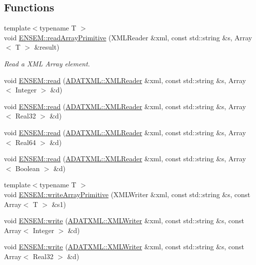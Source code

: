 \subsection*{Functions}
\begin{DoxyCompactItemize}
\item 
{\footnotesize template$<$typename T $>$ }\\void \mbox{\hyperlink{namespaceENSEM_a595aa36e757c1e7259eeaf7e6421941c}{E\+N\+S\+E\+M\+::read\+Array\+Primitive}} (X\+M\+L\+Reader \&xml, const std\+::string \&s, Array$<$ T $>$ \&result)
\begin{DoxyCompactList}\small\item\em Read a X\+ML Array element. \end{DoxyCompactList}\item 
void \mbox{\hyperlink{namespaceENSEM_a59df78af1e673ccefd2496b40ffcebac}{E\+N\+S\+E\+M\+::read}} (\mbox{\hyperlink{classADATXML_1_1XMLReader}{A\+D\+A\+T\+X\+M\+L\+::\+X\+M\+L\+Reader}} \&xml, const std\+::string \&s, Array$<$ Integer $>$ \&d)
\item 
void \mbox{\hyperlink{namespaceENSEM_a35ede464f1c4210bc6236f281a40ee73}{E\+N\+S\+E\+M\+::read}} (\mbox{\hyperlink{classADATXML_1_1XMLReader}{A\+D\+A\+T\+X\+M\+L\+::\+X\+M\+L\+Reader}} \&xml, const std\+::string \&s, Array$<$ Real32 $>$ \&d)
\item 
void \mbox{\hyperlink{namespaceENSEM_ae92990139593325dd95e78b0bc6aa89d}{E\+N\+S\+E\+M\+::read}} (\mbox{\hyperlink{classADATXML_1_1XMLReader}{A\+D\+A\+T\+X\+M\+L\+::\+X\+M\+L\+Reader}} \&xml, const std\+::string \&s, Array$<$ Real64 $>$ \&d)
\item 
void \mbox{\hyperlink{namespaceENSEM_a13be7bdc8993a65ff255f214db955c16}{E\+N\+S\+E\+M\+::read}} (\mbox{\hyperlink{classADATXML_1_1XMLReader}{A\+D\+A\+T\+X\+M\+L\+::\+X\+M\+L\+Reader}} \&xml, const std\+::string \&s, Array$<$ Boolean $>$ \&d)
\item 
{\footnotesize template$<$typename T $>$ }\\void \mbox{\hyperlink{namespaceENSEM_aa9532f5b330c3180eaff3decbb77eb4b}{E\+N\+S\+E\+M\+::write\+Array\+Primitive}} (X\+M\+L\+Writer \&xml, const std\+::string \&s, const Array$<$ T $>$ \&s1)
\item 
void \mbox{\hyperlink{namespaceENSEM_a1e0e32b9a435ad75c6308eed3fbccdb9}{E\+N\+S\+E\+M\+::write}} (\mbox{\hyperlink{classADATXML_1_1XMLWriter}{A\+D\+A\+T\+X\+M\+L\+::\+X\+M\+L\+Writer}} \&xml, const std\+::string \&s, const Array$<$ Integer $>$ \&d)
\item 
void \mbox{\hyperlink{namespaceENSEM_a5d6d46f2975052a57ae6d284798b574a}{E\+N\+S\+E\+M\+::write}} (\mbox{\hyperlink{classADATXML_1_1XMLWriter}{A\+D\+A\+T\+X\+M\+L\+::\+X\+M\+L\+Writer}} \&xml, const std\+::string \&s, const Array$<$ Real32 $>$ \&d)

\end{DoxyCompactItemize}
